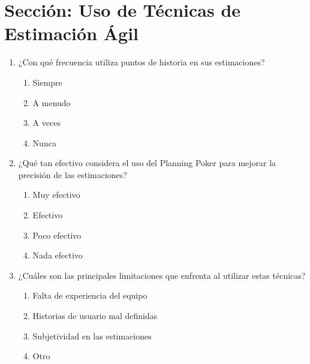 \section*{Sección: Uso de Técnicas de Estimación Ágil}
\begin{enumerate}[resume]
    \item ¿Con qué frecuencia utiliza puntos de historia en sus estimaciones?
    \begin{enumerate}
        \item Siempre
        \item A menudo
        \item A veces
        \item Nunca
    \end{enumerate}
    \item ¿Qué tan efectivo considera el uso del Planning Poker para mejorar la precisión de las estimaciones?
    \begin{enumerate}
        \item Muy efectivo
        \item Efectivo
        \item Poco efectivo
        \item Nada efectivo
    \end{enumerate}
    \item ¿Cuáles son las principales limitaciones que enfrenta al utilizar estas técnicas?
    \begin{enumerate}
        \item Falta de experiencia del equipo
        \item Historias de usuario mal definidas
        \item Subjetividad en las estimaciones
        \item Otro
    \end{enumerate}
\end{enumerate}
